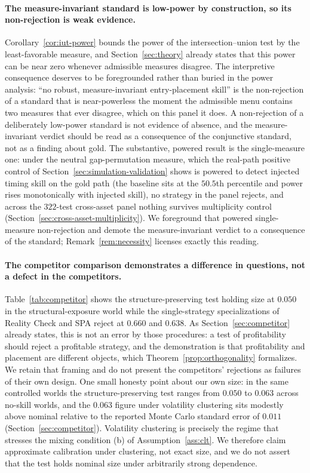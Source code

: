 \documentclass[risks,article,submit,pdftex,oneauthor]{Definitions/mdpi}
\begin{document}
\paragraph{The measure-invariant standard is low-power by construction, so its
non-rejection is weak evidence.} Corollary~\ref{cor:iut-power} bounds the power of the
intersection--union test by the least-favorable measure, and Section~\ref{sec:theory}
already states that this power can be near zero whenever admissible measures disagree.
The interpretive consequence deserves to be foregrounded rather than buried in the
power analysis: ``no robust, measure-invariant entry-placement skill'' is the
non-rejection of a standard that is near-powerless the moment the admissible menu
contains two measures that ever disagree, which on this panel it does. A non-rejection
of a deliberately low-power standard is not evidence of absence, and the measure-
invariant verdict should be read as a consequence of the conjunctive standard, not as a
finding about gold. The substantive, powered result is the single-measure one: under
the neutral gap-permutation measure, which the real-path positive control of
Section~\ref{sec:simulation-validation} shows is powered to detect injected timing skill
on the gold path (the baseline sits at the $50.5$th percentile and power rises
monotonically with injected skill), no strategy in the panel rejects, and across the
$322$-test cross-asset panel nothing survives multiplicity control
(Section~\ref{sec:cross-asset-multiplicity}). We foreground that powered single-measure
non-rejection and demote the measure-invariant verdict to a consequence of the standard;
Remark~\ref{rem:necessity} licenses exactly this reading.

\paragraph{The competitor comparison demonstrates a difference in questions, not a
defect in the competitors.} Table~\ref{tab:competitor} shows the structure-preserving
test holding size at $0.050$ in the structural-exposure world while the single-strategy
specializations of Reality Check and SPA reject at $0.660$ and $0.638$. As
Section~\ref{sec:competitor} already states, this is not an error by those procedures:
a test of profitability should reject a profitable strategy, and the demonstration is
that profitability and placement are different objects, which
Theorem~\ref{prop:orthogonality} formalizes. We retain that framing and do not
present the competitors' rejections as failures of their own design. One small honesty
point about our own size: in the same controlled worlds the structure-preserving test
ranges from $0.050$ to $0.063$ across no-skill worlds, and the $0.063$ figure under
volatility clustering sits modestly above nominal relative to the reported Monte Carlo
standard error of $0.011$ (Section~\ref{sec:competitor}). Volatility clustering is
precisely the regime that stresses the mixing condition (b) of
Assumption~\ref{ass:clt}. We therefore claim approximate calibration under clustering,
not exact size, and we do not assert that the test holds nominal size under arbitrarily
strong dependence.
\end{document}
